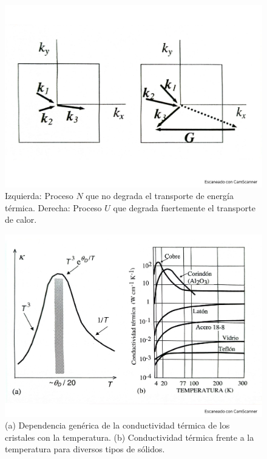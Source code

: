 \begin{figure}[h!] \centering
    \includegraphics[scale=0.5]{Cuerpo/Ch_05/Fotos libro 8.pdf}
    \caption{Izquierda: Proceso $N$ que no degrada el transporte de energía térmica. Derecha: Proceso $U$ que degrada fuertemente el transporte de calor.}
    \label{Fig:05-08}
\end{figure}    
\begin{figure}[h!] \centering
    \includegraphics[scale=0.5]{Cuerpo/Ch_05/Fotos libro 9.pdf}
    \caption{(a) Dependencia genérica de la conductividad térmica de los cristales con la temperatura. (b) Conductividad térmica frente a la temperatura para diversos tipos de sólidos.}
    \label{Fig:05-09}
\end{figure}    

